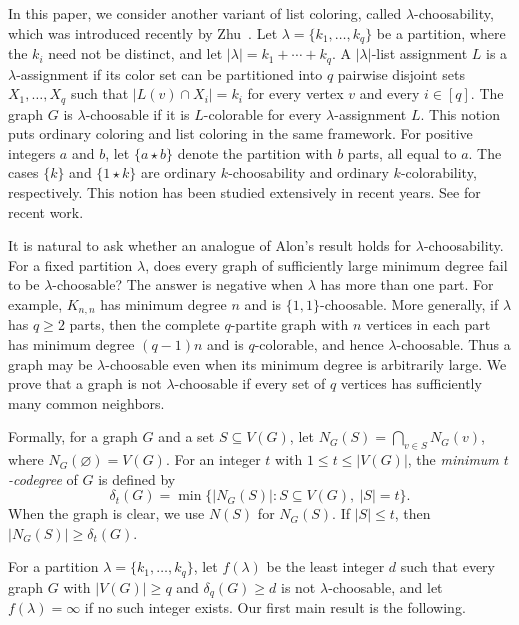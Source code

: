 \documentclass[12pt]{article}
\numberwithin{equation}{section}
\theoremstyle{definition}
\begin{document}
In this paper, we consider another variant of list coloring, called
$\lambda$-choosability, which was introduced recently by
Zhu~\cite{Zhu2020}. Let
$\lambda = \{k_1,\ldots,k_q\}$ be a partition, where the $k_i$ need not be distinct, and let $|\lambda| = k_1 + \cdots + k_q$. A
$|\lambda|$-list assignment $L$ is a $\lambda$-assignment if its color set can
be partitioned into $q$ pairwise disjoint sets $X_1,\ldots,X_q$ such that
$|L(v) \cap X_i| = k_i$ for every vertex $v$ and every $i \in [q]$. The graph $G$ is
$\lambda$-choosable if it is $L$-colorable for every $\lambda$-assignment
$L$. This notion puts ordinary coloring and list coloring in the same
framework. For positive integers $a$ and $b$, let $\{a \star b\}$ denote the
partition with $b$ parts, all equal to $a$. The cases $\{k\}$ and
$\{1 \star k\}$ are ordinary $k$-choosability and ordinary
$k$-colorability, respectively. This notion has been studied extensively in recent years. See
\cite{GuZhu2023,ZhuZhu2021,GuJiangWoodZhu2023,ZhuZhu2025} for recent work.

It is natural to ask whether an analogue of Alon's result holds for
$\lambda$-choosability. For a fixed partition $\lambda$, does every graph of
sufficiently large minimum degree fail to be $\lambda$-choosable? The answer
is negative when $\lambda$ has more than one part. For example, $K_{n,n}$ has
minimum degree $n$ and is $\{1,1\}$-choosable. More generally, if $\lambda$
has $q \geq 2$ parts, then the complete $q$-partite graph with $n$ vertices in
each part has minimum degree $(q - 1)n$ and is $q$-colorable, and hence
$\lambda$-choosable. Thus a graph may be
$\lambda$-choosable even when its minimum degree is arbitrarily large. We
prove that a graph is not $\lambda$-choosable if every set of
$q$ vertices has sufficiently many common neighbors.

Formally, for a graph $G$ and a set $S \subseteq V(G)$, let
$N_G(S) = \bigcap_{v \in S} N_G(v)$, where
$N_G(\varnothing)=V(G)$. For an integer $t$ with
$1\leq t\leq |V(G)|$, the
\emph{minimum $t$-codegree} of $G$ is defined by
\[
 \delta_t(G)
 = \min\bigl\{|N_G(S)| : S \subseteq V(G),\ |S|=t\bigr\}.
\]
When the graph is clear, we use $N(S)$ for $N_G(S)$. If $|S| \leq t$, then
$|N_G(S)| \geq \delta_t(G)$.

For a partition $\lambda=\{k_1,\ldots,k_q\}$, let $f(\lambda)$ be the least
integer $d$ such that every graph $G$ with $|V(G)|\geq q$ and
$\delta_q(G)\geq d$ is not $\lambda$-choosable, and let
$f(\lambda)=\infty$ if no such integer exists.
Our first main result is the following.
\end{document}
